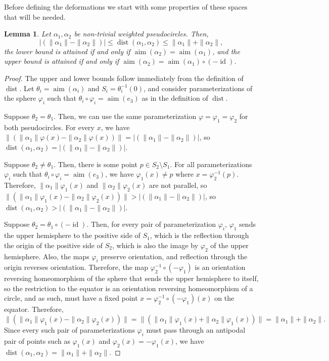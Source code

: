 \documentclass[JEP,XML,SOM,Unicode,NoFloatCountersInSection,published]{cedram}
\newtheorem{lemma}[theorem]{Lemma}
\theoremstyle{remark}
\let\phi\varphi
\DeclareMathOperator{\dist}{dist}
\DeclareMathOperator{\aim}{aim}
\DeclareMathOperator{\id}{id}
\begin{document}
Before defining the deformations we start with some properties of these spaces that will be needed.

\begin{lemma}\label{lemma-pseudocircle-dist}
Let $\alpha_1,\alpha_2$ be non-trivial weighted pseudocircles.
Then,
\[\left|\left(\|\alpha_1\|-\|\alpha_2\|\right)\right| \leq \dist(\alpha_1,\alpha_2) \leq \|\alpha_1\|+\|\alpha_2\|,\]
the lower bound is attained if and only if $\aim(\alpha_2) = \aim(\alpha_1)$,
and the upper bound is attained if and only if $\aim(\alpha_2) = \aim(\alpha_1)\circ(-\id)$.
\end{lemma}

\begin{proof}
The upper and lower bounds follow immediately from the definition of $\dist$.
Let $\theta_i = \aim(\alpha_i)$ and $S_i = \theta_i^{-1}(0)$,
and consider parameterizations of the sphere $\phi_i$ such that $\theta_i \circ \phi_i = \aim(e_3)$ as in the definition of $\dist$.

Suppose $\theta_2=\theta_1$. Then, we can use the same parameterization $\phi = \phi_1 = \phi_2$ for both pseudocircles.
For every $x$, we have
$\|(\|\alpha_1\|\phi(x) - \|\alpha_2\|\phi(x))\| = \left|(\|\alpha_1\|-\|\alpha_2\|)\right|$,
so $\dist(\alpha_1,\alpha_2) = \left|(\|\alpha_1\|-\|\alpha_2\|)\right|$.

Suppose $\theta_2\neq \theta_1$. Then, there is some point $p \in S_2 \setminus S_1$. For all parameterizations $\phi_i$ such that $\theta_i \circ \phi_i = \aim(e_3)$, we have $\phi_1(x) \neq p$ where $x = \phi_2^{-1}(p)$. Therefore, $\|\alpha_1\|\phi_1(x)$ and $\|\alpha_2\|\phi_2(x)$ are not parallel, so
$\|(\|\alpha_1\|\phi_1(x) - \|\alpha_2\|\phi_2(x))\| > \left|(\|\alpha_1\|-\|\alpha_2\|)\right|$,
so $\dist(\alpha_1,\alpha_2) > \left|(\|\alpha_1\|-\|\alpha_2\|)\right|$.

Suppose $\theta_2 = \theta_1\circ(-\id)$.
Then, for every pair of parameterization $\phi_i$, $\phi_1$ sends the upper hemisphere to the positive side of $S_1$, which is the reflection through the origin of the positive side of $S_2$, which is also the image by $\phi_2$ of the upper hemisphere.
Also, the maps $\phi_i$ preserve orientation, and reflection through the origin reverses orientation.
Therefore, the map $\phi_2^{-1}\circ (-\phi_1)$ is an orientation reversing homeomorphism of the sphere that sends the upper hemisphere to itself, so the restriction to the equator is an orientation reversing homeomorphism of a circle, and as such, must have a fixed point $x = \phi_2^{-1}\circ(-\phi_1)(x)$ on the equator. Therefore,
\[
\|(\|\alpha_1\|\phi_1(x) - \|\alpha_2\|\phi_2(x))\| = \|(\|\alpha_1\|\phi_1(x) + \|\alpha_2\|\phi_1(x))\| = \|\alpha_1\| + \|\alpha_2\|.
\]
Since every such pair of parameterizations $\phi_i$ must pass through an antipodal pair of points such as $\phi_1(x)$ and $\phi_2(x) = -\phi_1(x)$, we have $\dist(\alpha_1,\alpha_2) = \|\alpha_1\|+\|\alpha_2\|$.


\end{proof}
\end{document}
